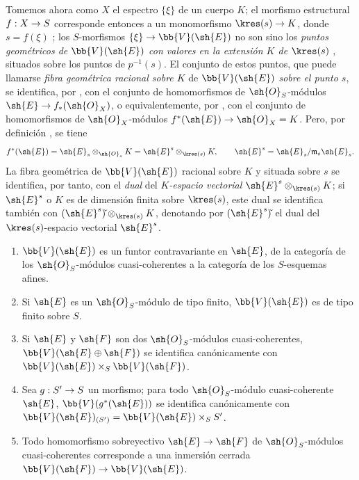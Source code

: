\documentclass[oneside,10pt]{amsart}
\makeatletter
\newcommand{\ega@arrow}[2]{\mathchoice{#1}{#2}{#2}{#2}}
\renewcommand{\to}{\ega@arrow{\longrightarrow}{\rightarrow}}
\let\EGAOriginalLabel\label
\renewcommand{\label}[1]{\phantomsection\EGAOriginalLabel{#1}}
\makeatother
\begin{document}
\begin{env}[1.7.10]
\label{II.1.7.10}
Tomemos ahora como $X$ el espectro $\{\xi\}$ de un cuerpo $K$; el morfismo estructural $f:X\to S$ corresponde entonces a un monomorfismo $\boldsymbol{\kres}(s)\to K$, donde $s=f(\xi)$ ; los $S$-morfismos $\{\xi\}\to\bb{V}(\sh{E})$ no son sino los \emph{puntos geométricos de $\bb{V}(\sh{E})$ con valores en la extensión $K$ de $\boldsymbol{\kres}(s)$} , situados sobre los puntos de $p^{-1}(s)$.
El conjunto de estos puntos, que puede llamarse \emph{fibra geométrica racional sobre $K$} de $\bb{V}(\sh{E})$ \emph{sobre el punto $s$}, se identifica, por , con el conjunto de homomorfismos de $\sh{O}_S$-módulos $\sh{E}\to f_*(\sh{O}_X)$, o equivalentemente, por , con el conjunto de homomorfismos de $\sh{O}_X$-módulos $f^*(\sh{E})\to\sh{O}_X=K$.
Pero, por definición , se tiene
\[
  f^*(\sh{E})=\sh{E}_s\otimes_{\sh{O}_s}K
  =\sh{E}^s\otimes_{\boldsymbol{\kres}(s)}K,
  \qquad
  \sh{E}^s=\sh{E}_s/\mathfrak{m}_s\sh{E}_s.
\]
La fibra geométrica de $\bb{V}(\sh{E})$ racional sobre $K$ y situada sobre $s$ se identifica, por tanto, con el \emph{dual} del \emph{$K$-espacio vectorial $\sh{E}^s\otimes_{\boldsymbol{\kres}(s)}K$}; si $\sh{E}^s$ o $K$ es de dimensión finita sobre $\boldsymbol{\kres}(s)$, este dual se identifica también con $(\sh{E}^s)\check{}\otimes_{\boldsymbol{\kres}(s)}K$, denotando por $(\sh{E}^s)\check{}$ el dual del $\boldsymbol{\kres}(s)$-espacio vectorial $\sh{E}^s$.
\end{env}

\begin{proposition}[1.7.11]
\label{II.1.7.11}
\medskip\noindent
\begin{enumerate}
  \item[{\rm(i)}] $\bb{V}(\sh{E})$ es un funtor contravariante en $\sh{E}$, de la categoría de los $\sh{O}_S$-módulos cuasi-coherentes a la categoría de los $S$-esquemas afines.
  \item[{\rm(ii)}] Si $\sh{E}$ es un $\sh{O}_S$-módulo de tipo finito, $\bb{V}(\sh{E})$ es de tipo finito sobre $S$.
  \item[{\rm(iii)}] Si $\sh{E}$ y $\sh{F}$ son dos $\sh{O}_S$-módulos cuasi-coherentes, $\bb{V}(\sh{E}\oplus\sh{F})$ se identifica canónicamente con $\bb{V}(\sh{E})\times_S\bb{V}(\sh{F})$.
  \item[{\rm(iv)}] Sea $g:S'\to S$ un morfismo; para todo $\sh{O}_S$-módulo cuasi-coherente $\sh{E}$, $\bb{V}(g^*(\sh{E}))$ se identifica canónicamente con $\bb{V}(\sh{E})_{(S')}=\bb{V}(\sh{E})\times_S S'$.
  \item[{\rm(v)}] Todo homomorfismo sobreyectivo $\sh{E}\to\sh{F}$ de $\sh{O}_S$-módulos cuasi-coherentes corresponde a una inmersión cerrada $\bb{V}(\sh{F})\to\bb{V}(\sh{E})$.
\end{enumerate}
\end{proposition}
\end{document}
